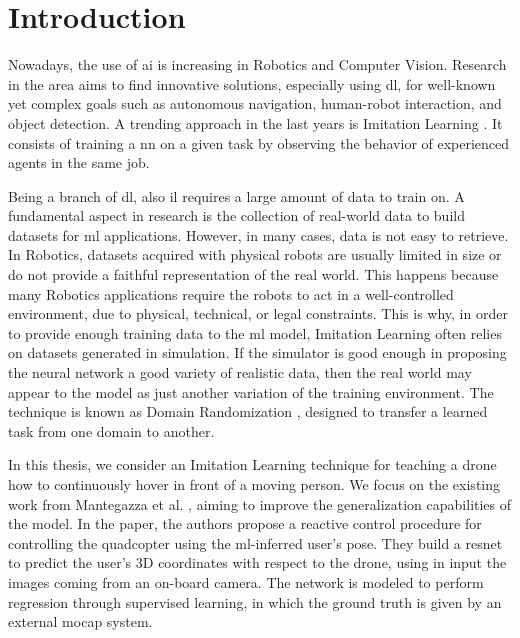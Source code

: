 \chapter{Introduction}
\label{chap:intro}

\glsresetall

Nowadays, the use of \gls{ai} is increasing in Robotics and Computer Vision. Research in the area aims to find innovative solutions, especially using \gls{dl}, for well-known yet complex goals such as autonomous navigation, human-robot interaction, and object detection. A trending approach in the last years is Imitation Learning \cite{imitation_learning_survey}. It consists of training a \gls{nn} on a given task by observing the behavior of experienced agents in the same job.

Being a branch of \gls{dl}, also \gls{il} requires a large amount of data to train on. A fundamental aspect in research is the collection of real-world data to build datasets for \gls{ml} applications. However, in many cases, data is not easy to retrieve. In Robotics, datasets acquired with physical robots are usually limited in size or do not provide a faithful representation of the real world. This happens because many Robotics applications require the robots to act in a well-controlled environment, due to physical, technical, or legal constraints. This is why, in order to provide enough training data to the \gls{ml} model, Imitation Learning often relies on datasets generated in simulation. If the simulator is good enough in proposing the neural network a good variety of realistic data, then the real world may appear to the model as just another variation of the training environment.  The technique is known as Domain Randomization \cite{tobin2017domain}, designed to transfer a learned task from one domain to another.

\medskip

In this thesis, we consider an Imitation Learning technique for teaching a drone how to continuously hover in front of a moving person. We focus on the existing work from Mantegazza et al. \cite{mantegazza2019visionbased}, aiming to improve the generalization capabilities of the model. In the paper, the authors propose a reactive control procedure for controlling the quadcopter using the \gls{ml}-inferred user's pose. They build a \gls{resnet} to predict the user's 3D coordinates with respect to the drone, using in input the images coming from an on-board camera. The network is modeled to perform regression through supervised learning, in which the ground truth is given by an external \gls{mocap} system.

